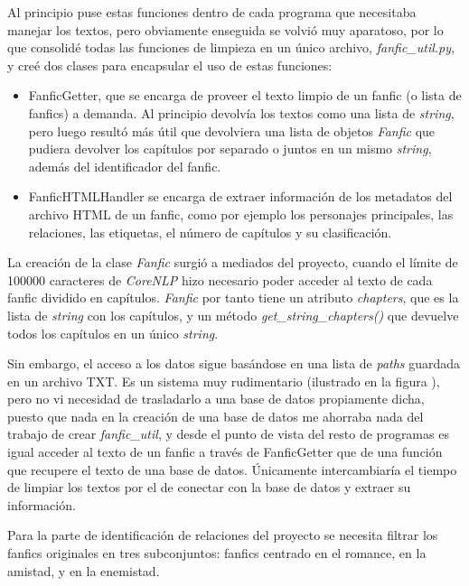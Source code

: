 \documentclass{pre-tfg}
\begin{document}
Al principio puse estas funciones dentro de cada programa que necesitaba manejar los textos, pero obviamente enseguida se volvió muy aparatoso, por lo que consolidé todas las funciones de limpieza en un único archivo, \textit{fanfic\_util.py}, y creé dos clases para encapsular el uso de estas funciones:

\begin{itemize}
	\item FanficGetter, que se encarga de proveer el texto limpio de un fanfic (o lista de fanfics) a demanda. Al principio devolvía los textos como una lista de \textit{string}, pero luego resultó más útil que devolviera una lista de objetos \textit{Fanfic} que pudiera devolver los capítulos por separado o juntos en un mismo \textit{string}, además del identificador del fanfic.
	\item FanficHTMLHandler se encarga de extraer información de los metadatos del archivo HTML de un fanfic, como por ejemplo los personajes principales, las relaciones, las etiquetas, el número de capítulos y su clasificación.
	
\end{itemize}


La creación de la clase \textit{Fanfic} surgió a mediados del proyecto, cuando el límite de 100000 caracteres de \textit{CoreNLP} hizo necesario poder acceder al texto de cada fanfic dividido en capítulos. \textit{Fanfic} por tanto tiene un atributo \textit{chapters}, que es la lista de \textit{string} con los capítulos, y un método \textit{get\_string\_chapters()} que devuelve todos los capítulos en un único \textit{string}.

Sin embargo, el acceso a los datos sigue basándose en una lista de \textit{paths} guardada en un archivo TXT. Es un sistema muy rudimentario (ilustrado en la figura ), pero no vi necesidad de trasladarlo a una base de datos propiamente dicha, puesto que nada en la creación de una base de datos me ahorraba nada del trabajo de crear \textit{fanfic\_util}, y desde el punto de vista del resto de programas es igual acceder al texto de un fanfic a través de FanficGetter que de una función que recupere el texto de una base de datos. Únicamente intercambiaría el tiempo de limpiar los textos por el de conectar con la base de datos y extraer su información.

Para la parte de identificación de relaciones del proyecto se necesita filtrar los fanfics originales en tres subconjuntos: fanfics centrado en el romance, en la amistad, y en la enemistad.
\end{document}
